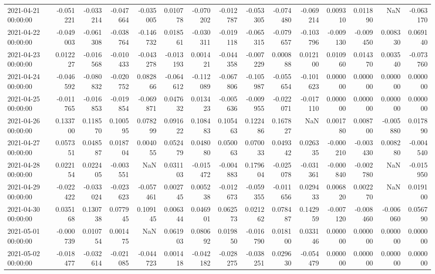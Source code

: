 \begin{tabular}{lrrrrrrrrrrrrrr}
2021-04-21 00:00:00 & -0.051221 & -0.033214 & -0.047664 & -0.035005 & 0.010778 & -0.070202 & -0.012787 & -0.053305 & -0.074480 & -0.069214 & 0.009310 & 0.011890 & NaN & -0.063170 \\
2021-04-22 00:00:00 & -0.049003 & -0.061308 & -0.038764 & -0.146732 & 0.018561 & -0.030311 & -0.019118 & -0.065315 & -0.079657 & -0.103796 & -0.009130 & -0.009450 & 0.008330 & 0.069140 \\
2021-04-23 00:00:00 & 0.012227 & -0.016568 & -0.010433 & -0.043278 & -0.013193 & 0.001421 & -0.044358 & -0.007229 & 0.000888 & 0.012100 & 0.010960 & 0.014370 & 0.003540 & -0.073760 \\
2021-04-24 00:00:00 & -0.046592 & -0.080832 & -0.020752 & 0.082866 & -0.064612 & -0.112089 & -0.067806 & -0.105987 & -0.055654 & -0.101623 & 0.000000 & 0.000000 & 0.000000 & 0.000000 \\
2021-04-25 00:00:00 & -0.011765 & -0.016853 & -0.019854 & -0.069871 & 0.047632 & 0.013423 & -0.005636 & -0.009955 & -0.022071 & -0.017110 & 0.000000 & 0.000000 & 0.000000 & 0.000000 \\
2021-04-26 00:00:00 & 0.133700 & 0.118570 & 0.100595 & 0.078299 & 0.091622 & 0.108483 & 0.105463 & 0.122486 & 0.167827 & NaN & 0.001780 & 0.008700 & -0.005880 & 0.017890 \\
2021-04-27 00:00:00 & 0.057351 & 0.048587 & 0.018704 & 0.004055 & 0.052479 & 0.048080 & 0.050063 & 0.070033 & 0.049342 & 0.026335 & -0.000210 & -0.003430 & 0.008280 & -0.004540 \\
2021-04-28 00:00:00 & 0.022154 & 0.022405 & -0.003551 & NaN & 0.031103 & -0.015472 & -0.004883 & 0.179604 & -0.025078 & -0.031361 & -0.000840 & -0.002780 & NaN & -0.015950 \\
2021-04-29 00:00:00 & -0.022422 & -0.033024 & -0.023623 & -0.057461 & 0.002745 & 0.005238 & -0.012673 & -0.059355 & -0.011656 & 0.029433 & 0.006820 & 0.002270 & NaN & 0.019100 \\
2021-04-30 00:00:00 & 0.035168 & 0.130738 & 0.077945 & 0.109145 & 0.006344 & 0.046901 & 0.062573 & 0.021262 & 0.078487 & 0.142959 & -0.007120 & -0.008460 & -0.006060 & 0.056790 \\
2021-05-01 00:00:00 & -0.000739 & 0.010754 & 0.001475 & NaN & 0.061903 & 0.080692 & 0.019850 & -0.016790 & 0.018100 & 0.033146 & 0.000000 & 0.000000 & 0.000000 & 0.000000 \\
2021-05-02 00:00:00 & -0.018477 & -0.032614 & -0.021085 & -0.044723 & 0.001418 & -0.042182 & -0.028275 & -0.038251 & 0.029630 & -0.054479 & 0.000000 & 0.000000 & 0.000000 & 0.000000 \\

\end{tabular}
